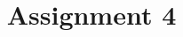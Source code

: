 \documentclass[12pt,a4paper]{article}
\title{Assignment 4}
\begin{document}
\maketitle

\lipsum
\end{document}
